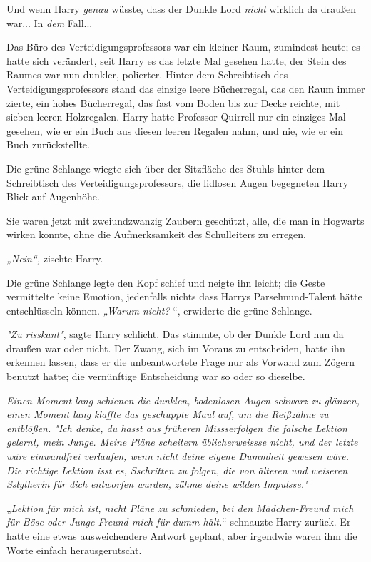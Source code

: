 {Und wenn Harry \emph{genau} wüsste, dass der Dunkle Lord \emph{nicht} wirklich da draußen war... In \emph{dem} Fall...

Das Büro des Verteidigungsprofessors war ein kleiner Raum, zumindest heute; es hatte sich verändert, seit Harry es das letzte Mal gesehen hatte, der Stein des Raumes war nun dunkler, polierter. Hinter dem Schreibtisch des Verteidigungsprofessors stand das einzige leere Bücherregal, das den Raum immer zierte, ein hohes Bücherregal, das fast vom Boden bis zur Decke reichte, mit sieben leeren Holzregalen. Harry hatte Professor Quirrell nur ein einziges Mal gesehen, wie er ein Buch aus diesen leeren Regalen nahm, und nie, wie er ein Buch zurückstellte.

Die grüne Schlange wiegte sich über der Sitzfläche des Stuhls hinter dem Schreibtisch des Verteidigungsprofessors, die lidlosen Augen begegneten Harry Blick auf Augenhöhe.

Sie waren jetzt mit zweiundzwanzig Zaubern geschützt, alle, die man in Hogwarts wirken konnte, ohne die Aufmerksamkeit des Schulleiters zu erregen.

\emph{„Nein“,} zischte Harry.

Die grüne Schlange legte den Kopf schief und neigte ihn leicht; die Geste vermittelte keine Emotion, jedenfalls nichts dass Harrys Parselmund-Talent hätte entschlüsseln können. \emph{„Warum nicht?} “, erwiderte die grüne Schlange.

\emph{"Zu} \emph{risskant"}, sagte Harry schlicht. Das stimmte, ob der Dunkle Lord nun da draußen war oder nicht. Der Zwang, sich im Voraus zu entscheiden, hatte ihn erkennen lassen, dass er die unbeantwortete Frage nur als Vorwand zum Zögern benutzt hatte; die vernünftige Entscheidung war so oder so dieselbe.

\emph{Einen Moment lang schienen die dunklen, bodenlosen Augen schwarz zu glänzen, einen Moment lang klaffte das geschuppte Maul auf, um die Reißzähne zu entblößen. \emph{"Ich denke, du} \emph{hasst} \emph{aus früheren} \emph{Missserfolgen} \emph{die} \emph{falsche Lektion gelernt, mein Junge. Meine Pläne} \emph{scheitern} \emph{üblicherweissse} \emph{nicht, und der letzte wäre einwandfrei verlaufen, wenn nicht deine eigene Dummheit gewesen wäre. Die richtige Lektion isst es,} \emph{Sschritten} \emph{zu folgen, die von älteren und weiseren} \emph{Sslytherin} \emph{für dich entworfen wurden,} \emph{zähme} \emph{deine wilden} \emph{Impulsse."}}

„\emph{Lektion für mich ist,} \emph{nicht Pläne zu schmieden, bei den Mädchen-Freund mich für Böse oder Junge-Freund mich für dumm hält.}“ schnauzte Harry zurück. Er hatte eine etwas ausweichendere Antwort geplant, aber irgendwie waren ihm die Worte einfach herausgerutscht.

}
